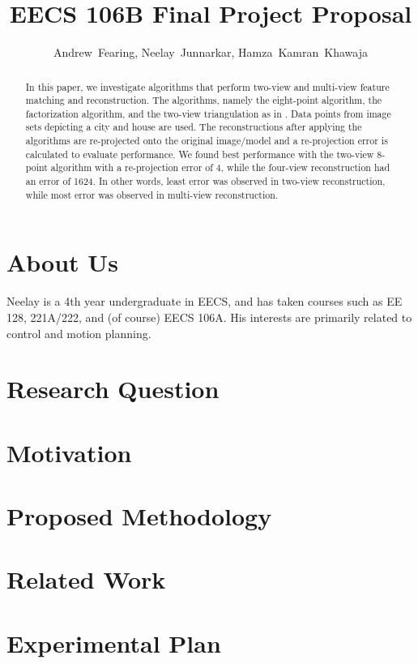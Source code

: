 \documentclass[journal]{IEEEtran}
\begin{document}
\title{EECS 106B Final Project Proposal}
\author{Andrew~Fearing, Neelay~Junnarkar,  Hamza~Kamran~Khawaja}
\maketitle




\begin{abstract} In this paper, we investigate algorithms that perform two-view and multi-view feature matching and reconstruction. The algorithms, namely the eight-point algorithm, the factorization algorithm, and the two-view triangulation as in \cite{ma2012invitation}. Data points from image sets depicting a city and house are used. The reconstructions after applying the algorithms are re-projected onto the original image/model and a re-projection error is calculated to evaluate performance. We found best performance with the two-view 8-point algorithm with a re-projection error of 4, while the four-view reconstruction had an error of 1624. In other words, least error was observed in two-view reconstruction, while most error was observed in multi-view reconstruction.
\end{abstract}


\section{About Us}
Neelay is a 4th year undergraduate in EECS, and has taken courses such as EE 128, 221A/222, and (of course) EECS 106A. His interests are primarily related to control and motion planning.

\section{Research Question}

\section{Motivation}

\section{Proposed Methodology}

\section{Related Work}

\section{Experimental Plan}
\end{document}
